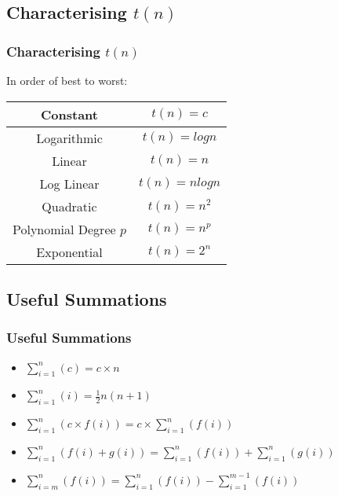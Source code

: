 \documentclass{beamer}
\begin{document}
\subsection{Characterising $t(n)$}
\begin{frame}
\frametitle{Characterising $t(n)$}
In order of best to worst:
\begin{tabular}{|c|c|}
\hline
Constant & $t(n) = c$ \\
\hline
Logarithmic & $t(n) = log n$\\
\hline
Linear & $t(n) = n$ \\
\hline
Log Linear & $t(n) = nlogn$ \\
\hline
Quadratic & $t(n) = n^2$\\
\hline
Polynomial Degree $p$ & $t(n) = n^p$\\
\hline
Exponential & $t(n) = 2^n$\\
\hline
\end{tabular}
\end{frame}
\subsection{Useful Summations}
\begin{frame}
\frametitle{Useful Summations}
\begin{itemize}
\item $\displaystyle\sum_{i=1}^{n}( c) = c \times n$
\item $\displaystyle\sum_{i=1}^{n}(i) = \frac{1}{2}n(n+1)$
\item $\displaystyle\sum_{i=1}^{n}(c \times f(i)) = c \times \displaystyle\sum_{i=1}^{n}(f(i))$
\item $\displaystyle\sum_{i=1}^{n}(f(i) + g(i)) = \displaystyle\sum_{i=1}^{n}(f(i)) + \displaystyle\sum_{i=1}^{n}(g(i))$
\item $\displaystyle\sum_{i=m}^{n}(f(i)) = \displaystyle\sum_{i=1}^{n}(f(i)) - \displaystyle\sum_{i=1}^{m-1}(f(i))$
\end{itemize}
\end{frame}
\end{document}
